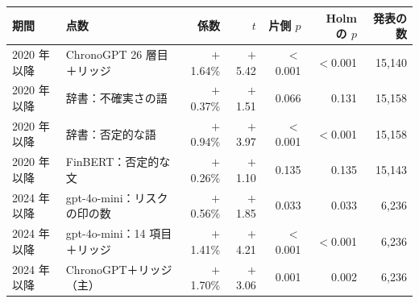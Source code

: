 \begin{tabular}{@{}llrrrrr@{}}
\toprule
期間 & 点数 & 係数 & $t$ & 片側 $p$ & Holm の $p$ & 発表の数 \\
\midrule
2020 年以降 & ChronoGPT 26 層目＋リッジ & $+$1.64\% & $+$5.42 & $<$0.001 & $<$0.001 & 15,140 \\
2020 年以降 & 辞書：不確実さの語 & $+$0.37\% & $+$1.51 & 0.066 & 0.131 & 15,158 \\
2020 年以降 & 辞書：否定的な語 & $+$0.94\% & $+$3.97 & $<$0.001 & $<$0.001 & 15,158 \\
2020 年以降 & FinBERT：否定的な文 & $+$0.26\% & $+$1.10 & 0.135 & 0.135 & 15,143 \\
2024 年以降 & gpt-4o-mini：リスクの印の数 & $+$0.56\% & $+$1.85 & 0.033 & 0.033 & 6,236 \\
2024 年以降 & gpt-4o-mini：14 項目＋リッジ & $+$1.41\% & $+$4.21 & $<$0.001 & $<$0.001 & 6,236 \\
2024 年以降 & ChronoGPT＋リッジ（主） & $+$1.70\% & $+$3.06 & 0.001 & 0.002 & 6,236 \\
\bottomrule
\end{tabular}
